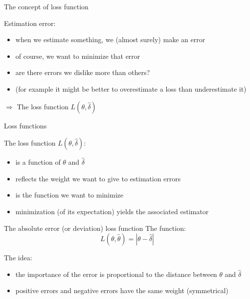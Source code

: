 \documentclass[11pt]{beamer}
\begin{document}
\begin{frame}{The concept of loss function}

Estimation error:
\begin{itemize}
\item when we estimate something, we (almost surely) make an error
\vfill

\item of course, we want to minimize that error
\vfill

\item are there errors we dislike more than others?
\vfill

\item (for example it might be better to overestimate a loss than underestimate it)
\end{itemize}
\vfill

\alert{$\Rightarrow$ The loss function $L(\theta,\hat{\delta})$}


\end{frame}
\begin{frame}{Loss functions}

The loss function $L(\theta,\hat{\delta})$:
\vfill

\begin{itemize}
\item is a function of $\theta$ and $\hat{\delta}$
\vfill

\item reflects the weight we want to give to estimation errors
\vfill

\item is the function we want to minimize
\vfill

\item minimization (of its expectation) yields the associated estimator
\end{itemize}

\end{frame}
\begin{frame}{The absolute error (or deviation) loss function}
The function:
\begin{equation}
L(\theta,\hat{\theta})=|\theta-\hat{\delta}|
\end{equation}

The idea:
\begin{itemize}
\item the importance of the error is proportional to the distance between $\theta$ and $\hat{\delta}$
\item positive errors and negative errors have the same weight (symmetrical)
\end{itemize}


\end{frame}
\end{document}
